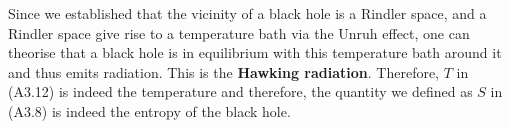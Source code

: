     Since we established that the vicinity of a black hole is a Rindler space, and a Rindler space give rise to a temperature bath via the Unruh effect, one can theorise that a black hole is in equilibrium with this temperature bath around it and thus emits radiation. This is the \textbf{Hawking radiation}. Therefore, $T$ in (A3.12) is indeed the temperature and therefore, the quantity we defined as $S$ in (A3.8) is indeed the entropy of the black hole.
